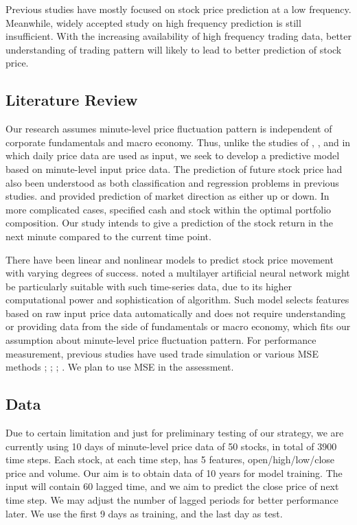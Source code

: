 \documentclass{article}
\begin{document}
Previous studies have mostly focused on stock price prediction at a low frequency. Meanwhile, widely accepted study on high frequency prediction is still insufficient. With the increasing availability of high frequency trading data, better understanding of trading pattern will likely to lead to better prediction of stock price.

\subsection{Literature Review}

Our research assumes minute-level price fluctuation pattern is independent of corporate fundamentals and macro economy. Thus, unlike the studies of \cite{Chiang2016}, \cite{Chourmouziadis2016}, and \cite{Zhong2017} in which daily price data are used as input, we seek to develop a predictive model based on minute-level input price data. The prediction of future stock price had also been understood as both classification and regression problems in previous studies. \cite{Chen2016} and \cite{Zhong2017} provided prediction of market direction as either up or down. In more complicated cases, \cite{Chourmouziadis2016} specified cash and stock within the optimal portfolio composition. Our study intends to give a prediction of the stock return in the next minute compared to the current time point.

There have been linear and nonlinear models to predict stock price movement with varying degrees of success. \cite{Chong2017} noted a multilayer artificial neural network might be particularly suitable with such time-series data, due to its higher computational power and sophistication of algorithm. Such model selects features based on raw input price data automatically and does not require understanding or providing data from the side of fundamentals or macro economy, which fits our assumption about minute-level price fluctuation pattern. For performance measurement, previous studies have used trade simulation or various MSE methods \cite{Chiang2016}; \cite{Chourmouziadis2016}; \cite{Zhong2017}; \cite{Chong2017}. We plan to use MSE in the assessment.

\subsection{Data}

Due to certain limitation and just for preliminary testing of our strategy, we are currently using 10 days of minute-level price data of 50 stocks, in total of 3900 time steps. Each stock, at each time step, has 5 features, open/high/low/close price and volume. Our aim is to obtain data of 10 years for model training. The input will contain 60 lagged time, and we aim to predict the close price of next time step. We may adjust the number of lagged periods for better performance later. We use the first 9 days as training, and the last day as test.
\end{document}
